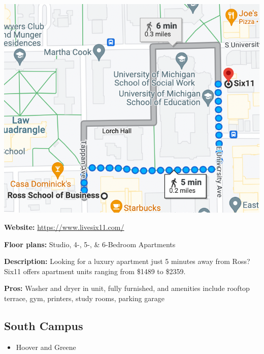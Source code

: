\documentclass[
]{book}
\providecommand{\tightlist}{%
  \setlength{\itemsep}{0pt}\setlength{\parskip}{0pt}}
\begin{document}
\begin{center}\includegraphics{611_map} \end{center}

\textbf{Website:} \url{https://www.livesix11.com/}

\textbf{Floor plans:} Studio, 4-, 5-, \& 6-Bedroom Apartments

\textbf{Description:} Looking for a luxury apartment just 5 minutes away from Ross? Six11 offers apartment units ranging from \$1489 to \$2359.

\textbf{Pros:} Washer and dryer in unit, fully furnished, and amenities include rooftop terrace, gym, printers, study rooms, parking garage

\hypertarget{south-campus}{%
\subsection{South Campus}\label{south-campus}}

\begin{itemize}
\tightlist
\item
  Hoover and Greene
\end{itemize}
\end{document}
